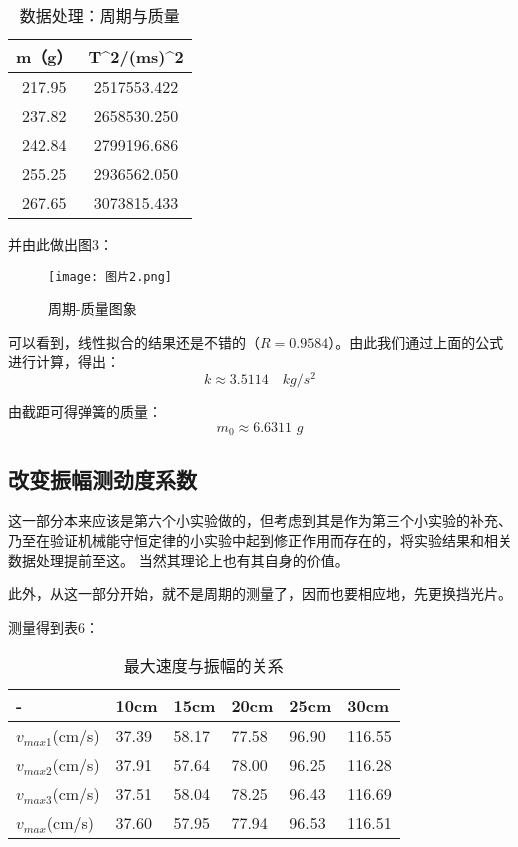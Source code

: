\documentclass[11pt]{article}
\begin{document}
\begin{table}[htbp]
    \centering
    \begin{tabular}{|c|c|}
    \hline
    m（g）   & T\textasciicircum{}2/(ms)\textasciicircum{}2 \\ \hline
    217.95 & 2517553.422                                  \\ \hline
    237.82 & 2658530.250                                   \\ \hline
    242.84 & 2799196.686                                  \\ \hline
    255.25 & 2936562.050                                   \\ \hline
    267.65 & 3073815.433                                  \\ \hline
    \end{tabular}
    \caption{数据处理：周期与质量}
    \end{table}

并由此做出图3：

\begin{figure}[htbp]
    \centering
    \texttt{[image: 图片2.png]}
    \caption{周期-质量图象}
\end{figure}

可以看到，线性拟合的结果还是不错的（$R=0.9584$）。由此我们通过上面的公式进行计算，得出：
\[k\approx 3.5114\quad kg/s^2\]

由截距可得弹簧的质量：
\[m_0\approx 6.6311\,\, g\]

\subsection{改变振幅测劲度系数}

这一部分本来应该是第六个小实验做的，但考虑到其是作为第三个小实验的补充、乃至在验证机械能守恒定律的小实验中起到修正作用而存在的，将实验结果和相关数据处理提前至这。
当然其理论上也有其自身的价值。

此外，从这一部分开始，就不是周期的测量了，因而也要相应地，先更换挡光片。

测量得到表6：

\begin{table}[!ht]
    \centering
    \begin{tabular}{|l|l|l|l|l|l|}
    \hline
        - & 10cm & 15cm & 20cm & 25cm & 30cm \\ \hline
        $v_{max1}$(cm/s) & 37.39 & 58.17 & 77.58 & 96.90 & 116.55 \\ \hline
        $v_{max2}$(cm/s) & 37.91 & 57.64 & 78.00 & 96.25 & 116.28 \\ \hline
        $v_{max3}$(cm/s) & 37.51 & 58.04 & 78.25 & 96.43 & 116.69 \\ \hline
        $v_{max}$(cm/s) & 37.60 & 57.95 & 77.94 & 96.53 & 116.51 \\ \hline
    \end{tabular}
    \caption{最大速度与振幅的关系}
\end{table}
\end{document}
